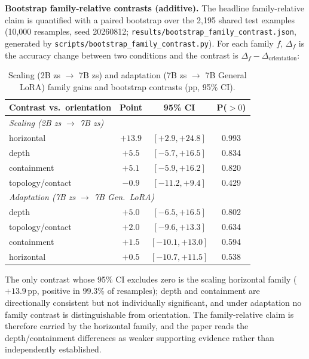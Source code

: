 \textbf{Bootstrap family-relative contrasts (additive).}
The headline family-relative claim is quantified with a paired bootstrap over
the 2,195 shared test examples (10{,}000 resamples, seed 20260812;
\texttt{results/bootstrap\_family\_contrast.json}, generated by
\texttt{scripts/bootstrap\_family\_contrast.py}). For each family $f$,
$\Delta_f$ is the accuracy change between two conditions and the contrast is
$\Delta_f - \Delta_{\mathrm{orientation}}$:

\begin{table}[h]
\centering
\footnotesize
\caption{Scaling (2B zs $\rightarrow$ 7B zs) and adaptation (7B zs
$\rightarrow$ 7B General LoRA) family gains and bootstrap contrasts
(pp, 95\% CI).}
\label{tab:bootstrap}
\begin{tabular}{lccc}
\toprule
Contrast vs.\ orientation & Point & 95\% CI & P($>0$) \\
\midrule
\multicolumn{4}{l}{\emph{Scaling (2B zs $\rightarrow$ 7B zs)}} \\
\hspace{1em} horizontal & $+13.9$ & $[+2.9, +24.8]$ & 0.993 \\
\hspace{1em} depth & $+5.5$ & $[-5.7, +16.5]$ & 0.834 \\
\hspace{1em} containment & $+5.1$ & $[-5.9, +16.2]$ & 0.820 \\
\hspace{1em} topology/contact & $-0.9$ & $[-11.2, +9.4]$ & 0.429 \\
\multicolumn{4}{l}{\emph{Adaptation (7B zs $\rightarrow$ 7B Gen.\ LoRA)}} \\
\hspace{1em} depth & $+5.0$ & $[-6.5, +16.5]$ & 0.802 \\
\hspace{1em} topology/contact & $+2.0$ & $[-9.6, +13.3]$ & 0.634 \\
\hspace{1em} containment & $+1.5$ & $[-10.1, +13.0]$ & 0.594 \\
\hspace{1em} horizontal & $+0.5$ & $[-10.7, +11.5]$ & 0.538 \\
\bottomrule
\end{tabular}
\end{table}

The only contrast whose 95\% CI excludes zero is the scaling horizontal
family ($+13.9\,\mathrm{pp}$, positive in 99.3\% of resamples); depth and containment
are directionally consistent but not individually significant, and under
adaptation no family contrast is distinguishable from orientation. The
family-relative claim is therefore carried by the horizontal family, and the
paper reads the depth/containment differences as weaker supporting evidence
rather than independently established.

